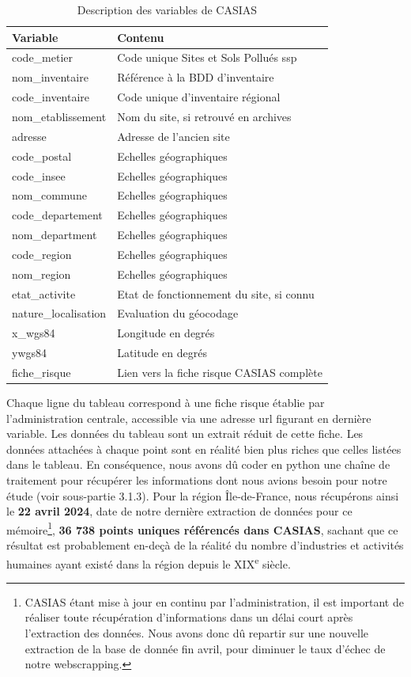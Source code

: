 \documentclass[a4paper,twoside,12pt]{book}
\newcommand{\siecle}[1]{\textsc{#1}\textsuperscript{e} siècle}
\begin{document}
\begin{table}[h]
\centering
\small
\caption{Description des variables de CASIAS}
\begin{tabular}{>{\raggedright}p{3.5cm}p{9cm}}
    \toprule
    Variable & Contenu \\
    \midrule
    code\_metier & Code unique Sites et Sols Pollués ssp  \\
    nom\_inventaire & Référence à la BDD d'inventaire \\
    code\_inventaire & Code unique d'inventaire régional \\
    nom\_etablissement & Nom du site, si retrouvé en archives \\
    adresse & Adresse de l'ancien site \\
    code\_postal & Echelles géographiques \\
    code\_insee & Echelles géographiques\\
    nom\_commune & Echelles géographiques \\
    code\_departement & Echelles géographiques \\
    nom\_department & Echelles géographiques \\
    code\_region & Echelles géographiques \\
    nom\_region & Echelles géographiques \\
    etat\_activite & Etat de fonctionnement du site, si connu \\
    nature\_localisation & Evaluation du géocodage \\
    x\_wgs84 & Longitude en degrés  \\
    ywgs84 & Latitude en degrés \\
    fiche\_risque & Lien vers la fiche risque CASIAS complète \\
    \bottomrule
\end{tabular}
\end{table}

Chaque ligne du tableau correspond à une fiche risque établie par l'administration centrale, accessible via une adresse url figurant en dernière variable. Les données du tableau sont un extrait réduit de cette fiche. Les données attachées à chaque point sont en réalité bien plus riches que celles listées dans le tableau. En conséquence, nous avons dû coder en python une chaîne de traitement pour récupérer les informations dont nous avions besoin pour notre étude (voir sous-partie 3.1.3). Pour la région Île-de-France, nous récupérons ainsi le \textbf{22 avril 2024}, date de notre dernière extraction de données pour ce mémoire\footnote{CASIAS étant mise à jour en continu par l'administration, il est important de réaliser toute récupération d'informations dans un délai court après l'extraction des données. Nous avons donc dû repartir sur une nouvelle extraction de la base de donnée fin avril, pour diminuer le taux d'échec de notre webscrapping.}, \textbf{36 738 points uniques référencés dans CASIAS}, sachant que ce résultat est probablement en-deçà de la réalité du nombre d'industries et activités humaines ayant existé dans la région depuis le \siecle{XIX}.
\end{document}
